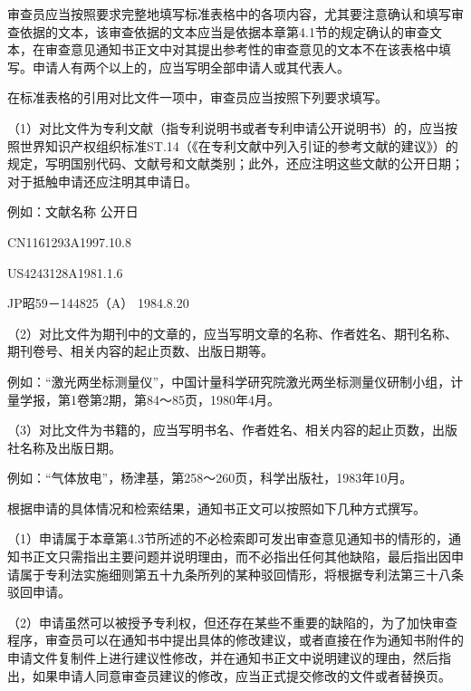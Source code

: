 审查员应当按照要求完整地填写标准表格中的各项内容，尤其要注意确认和填写审查依据的文本，该审查依据的文本应当是依据本章第4.1节的规定确认的审查文本，在审查意见通知书正文中对其提出参考性的审查意见的文本不在该表格中填写。申请人有两个以上的，应当写明全部申请人或其代表人。

在标准表格的引用对比文件一项中，审查员应当按照下列要求填写。

{\setlength{\parindent}{17.1bp}（1）对比文件为专利文献（指专利说明书或者专利申请公开说明书）的，应当按照世界知识产权组织标准ST.14（《在专利文献中列入引证的参考文献的建议》）的规定，写明国别代码、文献号和文献类别；此外，还应注明这些文献的公开日期；对于抵触申请还应注明其申请日。\par}

例如：文献名称       公开日

{\setlength{\parindent}{58.2bp}CN1161293A1997.10.8\par}

{\setlength{\parindent}{58.2bp}US4243128A1981.1.6\par}

{\setlength{\parindent}{58.2bp}JP昭59－144825（A）  1984.8.20\par}

{\setlength{\parindent}{17.1bp}（2）对比文件为期刊中的文章的，应当写明文章的名称、作者姓名、期刊名称、期刊卷号、相关内容的起止页数、出版日期等。\par}

例如：“激光两坐标测量仪”，中国计量科学研究院激光两坐标测量仪研制小组，计量学报，第1卷第2期，第84～85页，1980年4月。

{\setlength{\parindent}{17.1bp}（3）对比文件为书籍的，应当写明书名、作者姓名、相关内容的起止页数，出版社名称及出版日期。\par}

例如：“气体放电”，杨津基，第258～260页，科学出版社，1983年10月。

根据申请的具体情况和检索结果，通知书正文可以按照如下几种方式撰写。

{\setlength{\parindent}{17.1bp}（1）申请属于本章第4.3节所述的不必检索即可发出审查意见通知书的情形的，通知书正文只需指出主要问题并说明理由，而不必指出任何其他缺陷，最后指出因申请属于专利法实施细则第五十九条所列的某种驳回情形，将根据专利法第三十八条驳回申请。\par}

{\setlength{\parindent}{17.1bp}（2）申请虽然可以被授予专利权，但还存在某些不重要的缺陷的，为了加快审查程序，审查员可以在通知书中提出具体的修改建议，或者直接在作为通知书附件的申请文件复制件上进行建议性修改，并在通知书正文中说明建议的理由，然后指出，如果申请人同意审查员建议的修改，应当正式提交修改的文件或者替换页。\par}

